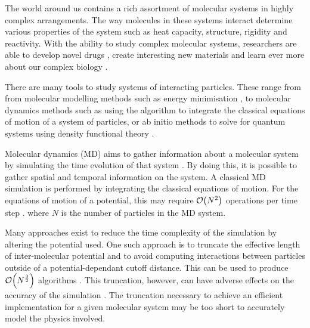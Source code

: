 %
%

%
The world around us contains
a rich assortment of molecular systems in
highly complex arrangements.
%
The way molecules in these systems interact determine various properties
of the system such as heat capacity, structure, rigidity and reactivity.
%
With the ability to study complex molecular systems,
researchers are able to develop novel drugs
\cite{perryman2004hiv},
create interesting new materials \cite{rao2001science} and
learn ever more about our complex biology \cite{karplus1990molecular}.

%
There are many tools to study systems of interacting particles.
These range from from molecular modelling methods such as
energy minimisation \cite[p.~306]{schlick2010molecular},
to molecular dynamics methods such as using the \velocityverlet{}
algorithm \cite{swope1982computer}
to integrate the classical equations of motion of a
system of particles, or ab initio methods to solve for quantum systems
using density functional theory \cite{parr1995density}.


%
Molecular dynamics (MD) aims to
gather information about a molecular system by
simulating the time evolution of that system
\cite[p.~63]{frenkel2001understanding}.
%
By doing this, it is possible to
gather spatial and temporal information on the system.
%
A classical MD simulation is performed by integrating
the classical equations of motion.
%
For the equations of motion of a \twobody{} potential,
this may require $\mathcal{O}{\left({ N^2 }\right)}$ operations per time step
\cite[p.~67]{frenkel2001understanding}.
where $N$ is the number of particles in the MD system.


Many approaches exist to reduce the time complexity of
the simulation by altering the potential used.
%
One such approach is to truncate the effective length of inter-molecular
potential and to avoid computing interactions between particles outside of a
potential-dependant cutoff distance.
%
This can be used to produce $\mathcal{O}{\left({ N^{\frac{3}{2}} }\right)}$ algorithms
\cite[p.~545]{frenkel2001understanding}.
%
This truncation, however, can have adverse effects on the accuracy
of the simulation \cite{patra2003molecular}.
%
The truncation necessary to achieve an efficient implementation
for a given molecular system may be
too short to accurately model the physics involved.

